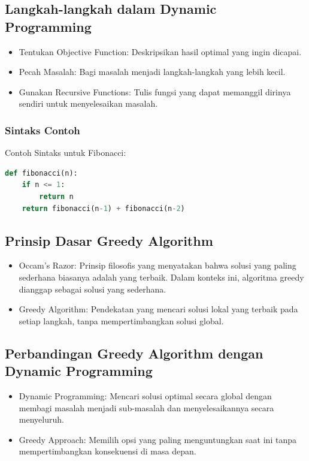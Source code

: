 \documentclass{article}
\begin{document}
\subsection{Langkah-langkah dalam Dynamic Programming}
\begin{itemize}
    \item Tentukan Objective Function: Deskripsikan hasil optimal yang ingin dicapai.
    \item Pecah Masalah: Bagi masalah menjadi langkah-langkah yang lebih kecil.
    \item Gunakan Recursive Functions: Tulis fungsi yang dapat memanggil dirinya sendiri untuk menyelesaikan masalah.
\end{itemize}

\subsubsection{Sintaks Contoh}
Contoh Sintaks untuk Fibonacci:
\begin{lstlisting}[language=Python, caption={}, captionpos=b]
def fibonacci(n):
    if n <= 1:
        return n
    return fibonacci(n-1) + fibonacci(n-2)
\end{lstlisting}

\subsection{Prinsip Dasar Greedy Algorithm}
\begin{itemize}
    \item Occam's Razor: Prinsip filosofis yang menyatakan bahwa solusi yang paling sederhana biasanya adalah yang terbaik. Dalam konteks ini, algoritma greedy dianggap sebagai solusi yang sederhana.
    \item Greedy Algorithm: Pendekatan yang mencari solusi lokal yang terbaik pada setiap langkah, tanpa mempertimbangkan solusi global.
\end{itemize}

\subsection{Perbandingan Greedy Algorithm dengan Dynamic Programming}
\begin{itemize}
    \item Dynamic Programming: Mencari solusi optimal secara global dengan membagi masalah menjadi sub-masalah dan menyelesaikannya secara menyeluruh.
    \item Greedy Approach: Memilih opsi yang paling menguntungkan saat ini tanpa mempertimbangkan konsekuensi di masa depan.
\end{itemize}
\end{document}
